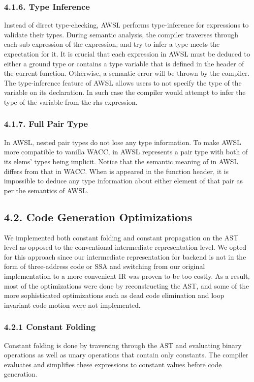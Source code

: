 \documentclass[10pt,a4paper]{report}
\begin{document}
  \subsubsection*{4.1.6. Type Inference}
  Instead of direct type-checking, AWSL performs type-inference for expressions to validate their types. During semantic analysis, the
  compiler traverses through each sub-expression of the expression, and try to infer a type meets the expectation for it. 
  It is crucial that each expression in AWSL must be deduced to either a ground type or contains a type variable that is defined in the 
  header of the current function. Otherwise, a semantic error will be thrown by the compiler.\\
  The type-inference feature of AWSL allows users to not specify the type of the variable on its declaration. In such case the compiler would 
  attempt to infer the type of the variable from the rhs expression.

  \subsubsection*{4.1.7. Full Pair Type}
  In AWSL, nested pair types do not lose any type information. To make AWSL more compatible to vanilla WACC,  in AWSL represents
  a pair type with both of its elems' types being implicit. Notice that the semantic meaning of  in AWSL differs from that in WACC. 
  When  is appeared in the function header, it is impossible to deduce any type information about either element of that pair as 
  per the semantics of AWSL.

  \subsection*{4.2. Code Generation Optimizations}
  We implemented both constant folding and constant propagation on the AST level
  as opposed to the conventional intermediate representation level. We opted for
  this approach since our intermediate representation for backend is not in the
  form of three-address code or SSA and switching from our original
  implementation to a more convenient IR was proven to be too costly. As a
  result, most of the optimizations were done by reconstructing the AST, and
  some of the more sophisticated optimizations such as dead code elimination and
  loop invariant code motion were not implemented.
  \subsubsection*{4.2.1	Constant Folding}
  Constant folding is done by traversing through the AST and evaluating binary operations as well as unary operations that contain only constants.
  The compiler evaluates and simplifies these expressions to constant values before code generation.
\end{document}
